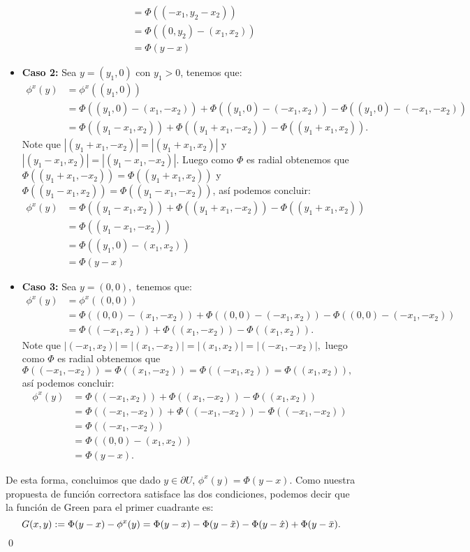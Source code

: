 \documentclass{article}
\begin{document}
\begin{homeworkProblem}[6]
\begin{solucion}
\begin{itemize}
\begin{align*}
        &=\Phi((-x_1,y_2-x_2))\\
        &=\Phi((0,y_2)-(x_1,x_2))\\
        &=\Phi(y-x)
       \end{align*}
       \item \textbf{Caso 2: }Sea $y=(y_1,0)$ con $y_1>0$, tenemos que:
       \begin{align*}
           \phi^x(y)&=\phi^x((y_1,0))\\
           &=\Phi((y_1,0)-(x_1,-x_2))+\Phi((y_1,0)-(-x_1,x_2))-\Phi((y_1,0)-(-x_1,-x_2))\\
           &=\Phi((y_1-x_1,x_2))+\Phi((y_1+x_1,-x_2))-\Phi((y_1+x_1,x_2)).
       \end{align*}
       Note que $|(y_1+x_1,-x_2)|=|(y_1+x_1,x_2)|$ y $|(y_1-x_1,x_2)|=|(y_1-x_1,-x_2)|$. Luego como $\Phi$ es radial obtenemos que $\Phi((y_1+x_1,-x_2))=\Phi((y_1+x_1,x_2))$ y $\Phi((y_1-x_1,x_2))=\Phi((y_1-x_1,-x_2))$, así podemos concluir:
       \begin{align*}
        \phi^x(y)&=\Phi((y_1-x_1,x_2))+\Phi((y_1+x_1,-x_2))-\Phi((y_1+x_1,x_2))\\
        &=\Phi((y_1-x_1,-x_2))\\
        &=\Phi((y_1,0)-(x_1,x_2))\\
        &=\Phi(y-x)
       \end{align*}
       \item \textbf{Caso 3: }Sea $y=(0,0),$ tenemos que:
       \begin{align*}
           \phi^x(y)&=\phi^x((0,0))\\
           &=\Phi((0,0)-(x_1,-x_2))+\Phi((0,0)-(-x_1,x_2))-\Phi((0,0)-(-x_1,-x_2))\\
           &=\Phi((-x_1,x_2))+\Phi((x_1,-x_2))-\Phi((x_1,x_2)).
       \end{align*}
       Note que $|(-x_1,x_2)|=|(x_1,-x_2)|=|(x_1,x_2)|=|(-x_1,-x_2)|,$ luego como $\Phi$ es radial obtenemos que $\Phi((-x_1,-x_2))=\Phi((x_1,-x_2))=\Phi((-x_1,x_2))=\Phi((x_1,x_2)),$ así podemos concluir: 
       \begin{align*}
        \phi^x(y)&=\Phi((-x_1,x_2))+\Phi((x_1,-x_2))-\Phi((x_1,x_2))\\
        &=\Phi((-x_1,-x_2))+\Phi((-x_1,-x_2))-\Phi((-x_1,-x_2))\\
        &=\Phi((-x_1,-x_2))\\
        &=\Phi((0,0)-(x_1,x_2))\\
        &=\Phi(y-x).
       \end{align*} 
   \end{itemize}
   De esta forma, concluimos que dado $y\in \partial U$, $\phi^x(y)=\Phi(y-x).$ Como nuestra propuesta de función correctora satisface las dos condiciones, podemos decir que la función de Green para el primer cuadrante es:
   $$G(x,y):=\Phi(y-x)-\phi^x(y)=\Phi(y-x)-\Phi(y-\Tilde{x})-\Phi(y-\hat{x})+\Phi(y-\bar{x}).$$
   \qed
   \end{solucion}
\end{homeworkProblem}
\end{document}

